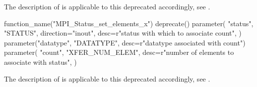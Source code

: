 The description of  is applicable to this deprecated  accordingly,
see .


\label{func:mpi-status-set-elements-x}

%
\begin{mpi-binding}
    function_name("MPI_Status_set_elements_x")
    deprecate()
    parameter(
        "status",
        "STATUS",
        direction="inout",
        desc=r"status with which to associate count",
    )
    parameter("datatype", "DATATYPE", desc=r"datatype associated with count")
    parameter(
        "count",
        "XFER_NUM_ELEM",
        desc=r"number of elements to associate with status",
    )
\end{mpi-binding}

The description of  is applicable to this deprecated  accordingly,
see .

